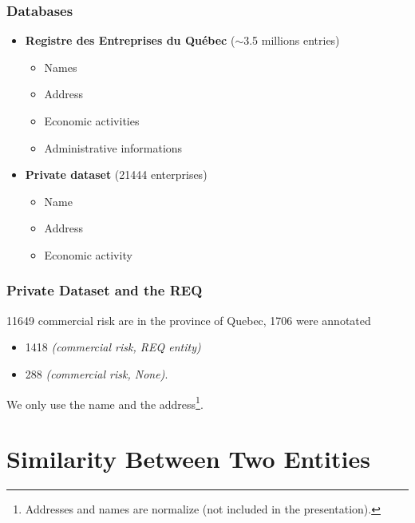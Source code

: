 \documentclass[aspectratio=169,10pt,xcolor=x11names,english,french]{beamer}
\begin{document}
	\begin{frame}[label=REQ]\frametitle{Databases} 
		\begin{itemize}
			\item 	\textbf{Registre des Entreprises du Québec} ($\sim$3.5 millions entries)
					\begin{itemize}
						\item Names
						\item Address
						\item Economic activities
						\item Administrative informations
					\end{itemize}
			\item 	\textbf{Private dataset} (\num{21444} enterprises)
			\begin{itemize}
				\item Name
				\item Address
				\item Economic activity
			\end{itemize}
		\end{itemize}
	\end{frame}
	
	\begin{frame}[label=intact-REQ]\frametitle{Private Dataset and the REQ} 
			\num{11649} commercial risk are in the province of Quebec, \num{1706} were annotated
				\begin{itemize}
					\item \num{1418} \textit{(commercial risk, REQ entity)}
					\item 288 \textit{(commercial risk, None)}.
				\end{itemize}
			We only use the name and the address\footnote{Addresses and names are normalize (not included in the presentation).}.
	\end{frame}
	
	\section{Similarity Between Two Entities}
	
\end{document}
